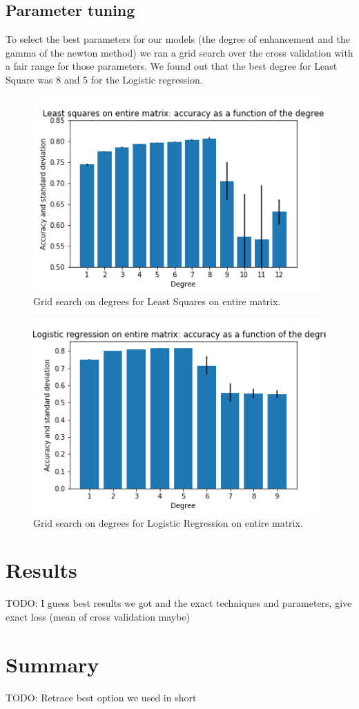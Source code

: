 \documentclass[10pt,conference,compsocconf]{IEEEtran}
\begin{document}
\subsection{Parameter tuning}
To select the best parameters for our models (the degree of enhancement and the gamma of the newton method) we ran a grid search over the cross validation with a fair range for those parameters. We found out that the best degree for Least Square was 8 and 5 for the Logistic regression.
\begin{figure}[tbp]
  \centering
  \includegraphics[width=\columnwidth]{ls_deg}
  \caption{Grid search on degrees for Least Squares on entire matrix.}
  \vspace{-3mm}
  \label{fig:denoise-fourier}
\end{figure}
\begin{figure}[tbp]
  \centering
  \includegraphics[width=\columnwidth]{lr_deg}
  \caption{Grid search on degrees for Logistic Regression on entire matrix.}
  \vspace{-3mm}
  \label{fig:denoise-fourier}
\end{figure}

\section{Results}

TODO: I guess best results we got and the exact techniques and parameters, give exact loss (mean of cross validation maybe)

\section{Summary}

TODO: Retrace best option we used in short



\end{document}
